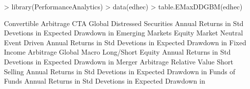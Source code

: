 \documentclass[12pt,letterpaper,english]{article}
\begin{document}
\begin{Schunk}
\begin{Sinput}
> library(PerformanceAnalytics)
> data(edhec)
> table.EMaxDDGBM(edhec)
\end{Sinput}
\begin{Soutput}
                       Convertible Arbitrage CTA Global Distressed Securities
Annual Returns in %                   7.7020     7.6711                9.7510
Std Devetions in %                    2.0047     2.5131                1.8348
Expected Drawdown in %                1.7083     2.5086                1.2412
                       Emerging Markets Equity Market Neutral Event Driven
Annual Returns in %              9.3612                7.3936       9.3190
Std Devetions in %               3.8571                0.9006       1.8350
Expected Drawdown in %           4.4855                0.4418       1.2828
                       Fixed Income Arbitrage Global Macro Long/Short Equity
Annual Returns in %                    5.0675       9.4208            9.4015
Std Devetions in %                     1.4171       1.7020            2.2174
Expected Drawdown in %                 1.2693       1.1179            1.7631
                       Merger Arbitrage Relative Value Short Selling
Annual Returns in %              8.3721         8.2317        3.2654
Std Devetions in %               1.1168         1.3195        5.5099
Expected Drawdown in %           0.5866         0.7941       14.0675
                       Funds of Funds
Annual Returns in %            7.1270
Std Devetions in %             1.8212
Expected Drawdown in %         1.5320
\end{Soutput}
\end{Schunk}
\end{document}

